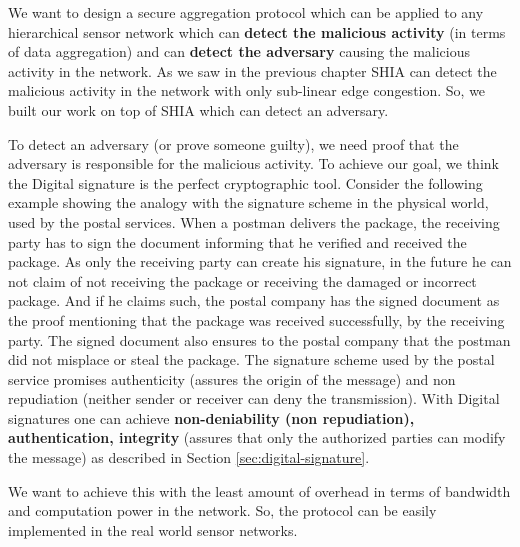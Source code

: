	We want to design a secure aggregation protocol which can be applied to any hierarchical sensor network which can \textbf{detect the malicious activity} (in terms of data aggregation) and can \textbf{detect the adversary} causing the malicious activity in the network.  
	As we saw in the previous chapter SHIA can detect the malicious activity in the network with only sub-linear edge congestion.
	So, we built our work on top of SHIA which can detect an adversary.

	To detect an adversary (or prove someone guilty), we need proof that the adversary is responsible for the malicious activity.	 
	To achieve our goal, we think the Digital signature is the perfect cryptographic tool.
	Consider the following example showing the analogy with the signature scheme in the physical world, used by the postal services.
	When a postman delivers the package, the receiving party has to sign the document informing that he verified and received the package.
	As only the receiving party can create his signature, in the future he can not claim of not receiving the package or receiving the damaged or incorrect package. 
	And if he claims such, the postal company has the
	signed document as the proof mentioning that the package was received successfully, by the receiving party.
	The signed document also ensures to the postal company that the postman did not misplace or steal the package.
	The signature scheme used by the postal service promises authenticity (assures the origin of the message) and non repudiation (neither sender or receiver can deny the transmission).
	With Digital signatures one can achieve \textbf{non-deniability  (non repudiation), authentication, integrity} (assures that only the authorized parties can modify the message) as described in Section \ref{sec:digital-signature}.
	
	We want to achieve this with the least amount of overhead in terms of bandwidth and computation power in the network.
	So, the protocol can be easily implemented in the real world sensor networks.
	

